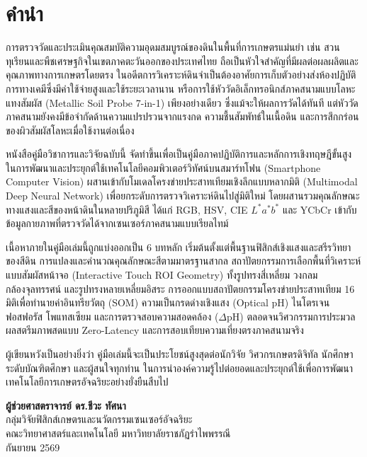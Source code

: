 \chapter*{คำนำ}

การตรวจวัดและประเมินคุณสมบัติความอุดมสมบูรณ์ของดินในพื้นที่การเกษตรแม่นยำ เช่น สวนทุเรียนและพืชเศรษฐกิจในเขตภาคตะวันออกของประเทศไทย ถือเป็นหัวใจสำคัญที่มีผลต่อผลผลิตและคุณภาพทางการเกษตรโดยตรง ในอดีตการวิเคราะห์ดินจำเป็นต้องอาศัยการเก็บตัวอย่างส่งห้องปฏิบัติการทางเคมีซึ่งมีค่าใช้จ่ายสูงและใช้ระยะเวลานาน หรือการใช้หัววัดอิเล็กทรอนิกส์ภาคสนามแบบโลหะแทงสัมผัส (Metallic Soil Probe 7-in-1) เพียงอย่างเดียว ซึ่งแม้จะให้ผลการวัดได้ทันที แต่หัววัดภาคสนามยังคงมีข้อจำกัดด้านความแปรปรวนจากแรงกด ความชื้นสัมพัทธ์ในเนื้อดิน และการสึกกร่อนของผิวสัมผัสโลหะเมื่อใช้งานต่อเนื่อง

หนังสือคู่มือวิชาการและวิจัยฉบับนี้ จัดทำขึ้นเพื่อเป็นคู่มือภาคปฏิบัติการและหลักการเชิงทฤษฎีขั้นสูง ในการพัฒนาและประยุกต์ใช้เทคโนโลยีคอมพิวเตอร์วิทัศน์บนสมาร์ทโฟน (Smartphone Computer Vision) ผสานเข้ากับโมเดลโครงข่ายประสาทเทียมเชิงลึกแบบหลากมิติ (Multimodal Deep Neural Network) เพื่อยกระดับการตรวจวิเคราะห์ดินไปสู่มิติใหม่ โดยผสานรวมคุณลักษณะทางแสงและสีของหน้าดินในหลายปริภูมิสี ได้แก่ RGB, HSV, CIE $L^*a^*b^*$ และ YCbCr เข้ากับข้อมูลกายภาพที่ตรวจวัดได้จากเซนเซอร์ภาคสนามแบบเรียลไทม์

เนื้อหาภายในคู่มือเล่มนี้ถูกแบ่งออกเป็น 6 บทหลัก เริ่มต้นตั้งแต่พื้นฐานฟิสิกส์เชิงแสงและสรีรวิทยาของสีดิน การแปลงและคำนวณคุณลักษณะสีตามมาตรฐานสากล สถาปัตยกรรมการเลือกพื้นที่วิเคราะห์แบบสัมผัสหน้าจอ (Interactive Touch ROI Geometry) ทั้งรูปทรงสี่เหลี่ยม วงกลมกล้องจุลทรรศน์ และรูปทรงหลายเหลี่ยมอิสระ การออกแบบสถาปัตยกรรมโครงข่ายประสาทเทียม 16 มิติเพื่อทำนายค่าอินทรียวัตถุ (SOM) ความเป็นกรดด่างเชิงแสง (Optical pH) ไนโตรเจน ฟอสฟอรัส โพแทสเซียม และการตรวจสอบความสอดคล้อง ($\Delta\text{pH}$) ตลอดจนวิศวกรรมการประมวลผลสตรีมภาพสดแบบ Zero-Latency และการสอบเทียบความเที่ยงตรงภาคสนามจริง

ผู้เขียนหวังเป็นอย่างยิ่งว่า คู่มือเล่มนี้จะเป็นประโยชน์สูงสุดต่อนักวิจัย วิศวกรเกษตรดิจิทัล นักศึกษาระดับบัณฑิตศึกษา และผู้สนใจทุกท่าน ในการนำองค์ความรู้ไปต่อยอดและประยุกต์ใช้เพื่อการพัฒนาเทคโนโลยีการเกษตรอัจฉริยะอย่างยั่งยืนสืบไป

\vspace{1.5cm}

\begin{flushright}
\textbf{ผู้ช่วยศาสตราจารย์ ดร.ชีวะ ทัศนา}\\[0.2cm]
กลุ่มวิจัยฟิสิกส์เกษตรและนวัตกรรมเซนเซอร์อัจฉริยะ\\
คณะวิทยาศาสตร์และเทคโนโลยี มหาวิทยาลัยราชภัฏรำไพพรรณี\\
กันยายน 2569
\end{flushright}
